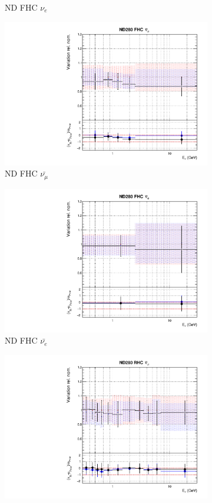 \begin{figure}[t]
\begin{subfigure}{0.24\textwidth}
  \caption{ND FHC $\nu_e$}
  \label{fig:}
\end{subfigure}
\begin{subfigure}{0.24\textwidth}
  \centering
  \includegraphics[width=0.95\linewidth]{figs/rhcmpasmvflux2}
  \caption{ND FHC $\bar{\nu_{\mu}}$}
  \label{fig:}
\end{subfigure}
\begin{subfigure}{0.24\textwidth}
  \centering
  \includegraphics[width=0.95\linewidth]{figs/rhcmpasmvflux3}
  \caption{ND FHC $\bar{\nu_{e}}$}
  \label{fig:}
\end{subfigure}
\begin{subfigure}{0.24\textwidth}
  \centering
  \includegraphics[width=0.95\linewidth]{figs/rhcmpasmvflux4}

\end{subfigure}
\end{figure}

